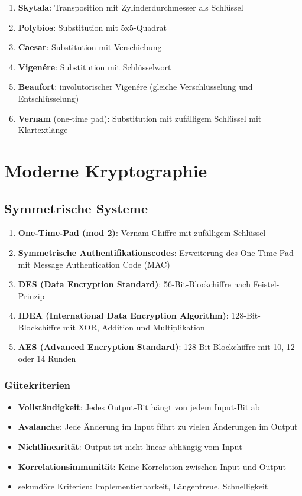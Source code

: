 \documentclass{article}
\begin{document}
\begin{enumerate}
  \item \textbf{Skytala}: Transposition mit Zylinderdurchmesser als Schlüssel
  \item \textbf{Polybios}: Substitution mit 5x5-Quadrat
  \item \textbf{Caesar}: Substitution mit Verschiebung
  \item \textbf{Vigenére}: Substitution mit Schlüsselwort
  \item \textbf{Beaufort}: involutorischer Vigenére (gleiche Verschlüsselung und Entschlüsselung)
  \item \textbf{Vernam} (one-time pad): Substitution mit zufälligem Schlüssel mit Klartextlänge
\end{enumerate}



\section{Moderne Kryptographie}
\subsection{Symmetrische Systeme}
\begin{enumerate}
  \item \textbf{One-Time-Pad (mod 2)}: Vernam-Chiffre mit zufälligem Schlüssel
  \item \textbf{Symmetrische Authentifikationscodes}: Erweiterung des One-Time-Pad mit Message Authentication Code (MAC)
  \item \textbf{DES (Data Encryption Standard)}: 56-Bit-Blockchiffre nach Feistel-Prinzip
  \item \textbf{IDEA (International Data Encryption Algorithm)}: 128-Bit-Blockchiffre mit XOR, Addition und Multiplikation
  \item \textbf{AES (Advanced Encryption Standard)}: 128-Bit-Blockchiffre mit 10, 12 oder 14 Runden
\end{enumerate}

\subsubsection{Gütekriterien}
\begin{itemize}
  \item \textbf{Vollständigkeit}: Jedes Output-Bit hängt von jedem Input-Bit ab
  \item \textbf{Avalanche}: Jede Änderung im Input führt zu vielen Änderungen im Output
  \item \textbf{Nichtlinearität}: Output ist nicht linear abhängig vom Input
  \item \textbf{Korrelationsimmunität}: Keine Korrelation zwischen Input und Output
  \item sekundäre Kriterien: Implementierbarkeit, Längentreue, Schnelligkeit
\end{itemize}
\end{document}
